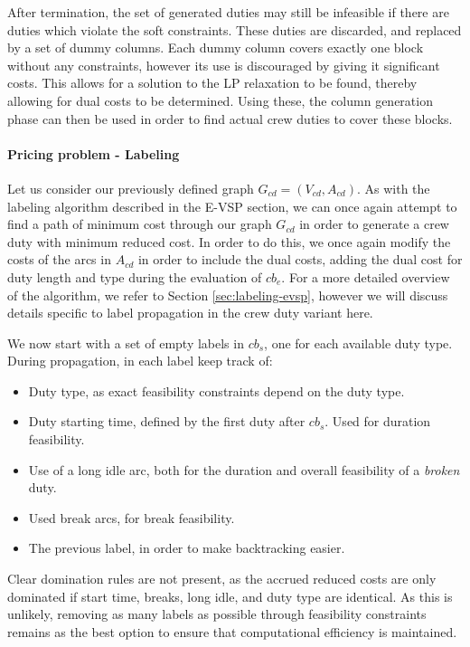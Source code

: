 \documentclass[]{article}
\begin{document}
\noindent After termination, the set of generated duties may still be infeasible if there are duties which violate the soft constraints. These duties are discarded, and replaced by a set of dummy columns. Each dummy column covers exactly one block without any constraints, however its use is discouraged by giving it significant costs. This allows for a solution to the LP relaxation to be found, thereby allowing for dual costs to be determined. Using these, the column generation phase can then be used in order to find actual crew duties to cover these blocks.

\paragraph{Pricing problem - Labeling}
Let us consider our previously defined graph $G_{cd} = (V_{cd}, A_{cd})$. As with the labeling algorithm described in the E-VSP section, we can once again attempt to find a path of minimum cost through our graph $G_{cd}$ in order to generate a crew duty with minimum reduced cost. In order to do this, we once again modify the costs of the arcs in $A_{cd}$ in order to include the dual costs, adding the dual cost for duty length and type during the evaluation of $cb_e$. For a more detailed overview of the algorithm, we refer to Section \ref{sec:labeling-evsp}, however we will discuss details specific to label propagation in the crew duty variant here. 

We now start with a set of empty labels in $cb_s$, one for each available duty type. During propagation, in each label keep track of:
\begin{itemize}
  \item Duty type, as exact feasibility constraints depend on the duty type.
  \item Duty starting time, defined by the first duty after $cb_s$. Used for duration feasibility.
  \item Use of a long idle arc, both for the duration and overall feasibility of a \textit{broken} duty.
  \item Used break arcs, for break feasibility. 
  \item The previous label, in order to make backtracking easier. 
\end{itemize}
Clear domination rules are not present, as the accrued reduced costs are only dominated if start time, breaks, long idle, and duty type are identical. As this is unlikely, removing as many labels as possible through feasibility constraints remains as the best option to ensure that computational efficiency is maintained.
\end{document}
